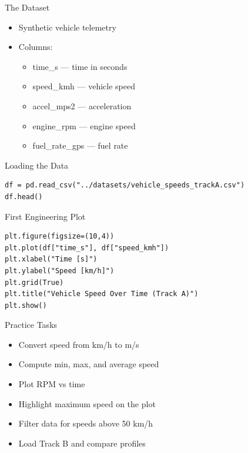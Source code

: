 \documentclass[aspectratio=169]{beamer}
\begin{document}
\begin{frame}{The Dataset}
  \begin{itemize}
    \item Synthetic vehicle telemetry
    \item Columns:
      \begin{itemize}
        \item time\_s — time in seconds
        \item speed\_kmh — vehicle speed
        \item accel\_mps2 — acceleration
        \item engine\_rpm — engine speed
        \item fuel\_rate\_gps — fuel rate
      \end{itemize}
  \end{itemize}
\end{frame}

\begin{frame}[fragile]{Loading the Data}
\begin{verbatim}
df = pd.read_csv("../datasets/vehicle_speeds_trackA.csv")
df.head()
\end{verbatim}
\end{frame}

\begin{frame}[fragile]{First Engineering Plot}
\begin{verbatim}
plt.figure(figsize=(10,4))
plt.plot(df["time_s"], df["speed_kmh"])
plt.xlabel("Time [s]")
plt.ylabel("Speed [km/h]")
plt.grid(True)
plt.title("Vehicle Speed Over Time (Track A)")
plt.show()
\end{verbatim}
\end{frame}

\begin{frame}{Practice Tasks}
  \begin{itemize}
    \item Convert speed from km/h to m/s
    \item Compute min, max, and average speed
    \item Plot RPM vs time
    \item Highlight maximum speed on the plot
    \item Filter data for speeds above 50 km/h
    \item Load Track B and compare profiles
  \end{itemize}
\end{frame}

\end{document}
